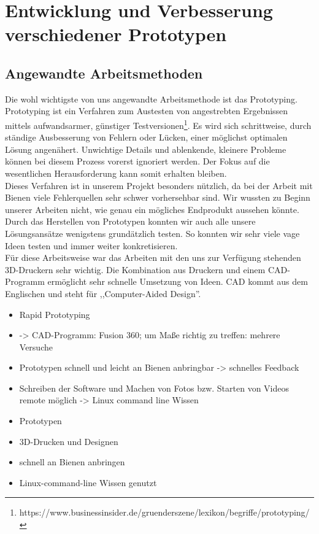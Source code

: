 \documentclass[11pt,a4paper]{article}
\begin{document}
\newpage
\section{Entwicklung und Verbesserung verschiedener Prototypen}
\subsection{Angewandte Arbeitsmethoden}
Die wohl wichtigste von uns angewandte Arbeitsmethode ist das Prototyping. Prototyping ist ein Verfahren zum Austesten von angestrebten Ergebnissen mittels aufwandsarmer, günstiger Testversionen\footnote{https://www.businessinsider.de/gruenderszene/lexikon/begriffe/prototyping/}. Es wird sich schrittweise, durch ständige Ausbesserung von Fehlern oder Lücken, einer möglichst optimalen Lösung angenähert. Unwichtige Details und ablenkende, kleinere Probleme können bei diesem Prozess vorerst ignoriert werden. Der Fokus auf die wesentlichen Herausforderung kann somit erhalten bleiben.\\
Dieses Verfahren ist in unserem Projekt besonders nützlich, da bei der Arbeit mit Bienen viele Fehlerquellen sehr schwer vorhersehbar sind. Wir wussten zu Beginn unserer Arbeiten nicht, wie genau ein mögliches Endprodukt aussehen könnte. Durch das Herstellen von Prototypen konnten wir auch alle unsere Lösungsansätze wenigstens grundätzlich testen. So konnten wir sehr viele vage Ideen testen und immer weiter konkretisieren.\\
Für diese Arbeitsweise war das Arbeiten mit den uns zur Verfügung stehenden 3D-Druckern sehr wichtig. Die Kombination aus Druckern und einem CAD-Programm ermöglicht sehr schnelle Umsetzung von Ideen. CAD kommt aus dem Englischen und steht für ,,Computer-Aided Design''. 
\begin{itemize}
    \item Rapid Prototyping
    \item -> CAD-Programm: Fusion 360; um Maße richtig zu treffen: mehrere Versuche
    \item Prototypen schnell und leicht an Bienen anbringbar -> schnelles Feedback
    \item Schreiben der Software und Machen von Fotos bzw. Starten von Videos remote möglich -> Linux command line Wissen
	\item Prototypen
	\item 3D-Drucken und Designen
	\item schnell an Bienen anbringen
	\item Linux-command-line Wissen genutzt
\end{itemize}
\end{document}

